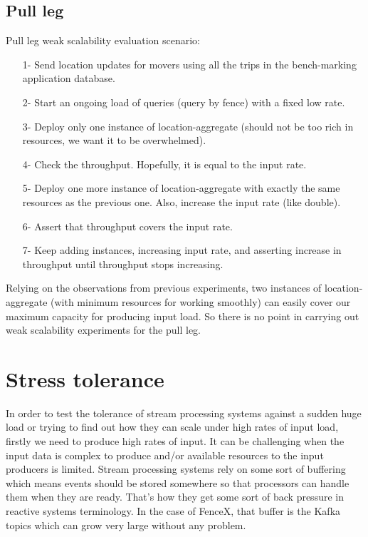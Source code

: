 \documentclass[a4]{report}
\begin{document}
    \subsection{Pull leg}
    Pull leg weak scalability evaluation scenario:
    \begin{itemize}
        \item[1-] Send location updates for movers using all the trips in the bench-marking application database.
        \item[2-] Start an ongoing load of queries (query by fence) with a fixed low rate.
        \item[3-] Deploy only one instance of location-aggregate (should not be too rich in resources, we want it to be overwhelmed).
        \item[4-] Check the throughput.
        Hopefully, it is equal to the input rate.
        \item[5-] Deploy one more instance of location-aggregate with exactly the same resources as the previous one.
        Also, increase the input rate (like double).
        \item[6-] Assert that throughput covers the input rate.
        \item[7-] Keep adding instances, increasing input rate, and asserting increase in throughput until throughput stops increasing.
    \end{itemize}

    Relying on the observations from previous experiments, two instances of location-aggregate (with minimum
    resources for working smoothly) can easily cover our maximum capacity for producing input load.
    So there is no point in carrying out weak scalability experiments for the pull leg.


    \section{Stress tolerance}
    In order to test the tolerance of stream processing systems against a sudden huge load or trying to find out how
    they can scale under high rates of input load, firstly we need to produce high rates of input.
    It can be challenging when the input data is complex to produce and/or available resources to the input producers
    is limited.
    Stream processing systems rely on some sort of buffering which means events should be stored somewhere so
    that processors can handle them when they are ready.
    That's how they get some sort of back pressure in reactive systems terminology.
    In the case of FenceX, that buffer is the Kafka topics which can grow very large without any problem.
\end{document}
